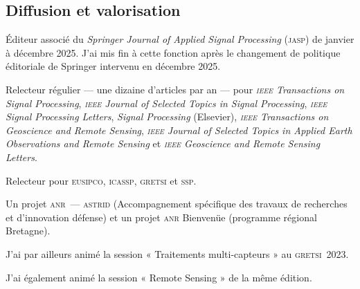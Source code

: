 


\subsection{Diffusion et valorisation}
\label{subsec:cv-diffusion}


\begin{cvfields}
  \item[Édition] Éditeur associé du \emph{Springer Journal of Applied Signal
    Processing} (\textsc{jasp}) de janvier à décembre 2025. J'ai mis fin à
    cette fonction après le changement de politique éditoriale de Springer
    intervenu en décembre 2025.
  \item[Revues] Relecteur régulier --- une dizaine d'articles par an --- pour
    \emph{\textsc{ieee} Transactions on Signal Processing},
    \emph{\textsc{ieee} Journal of Selected Topics in Signal Processing},
    \emph{\textsc{ieee} Signal Processing Letters}, \emph{Signal Processing}
    (Elsevier), \emph{\textsc{ieee} Transactions on Geoscience and Remote
    Sensing}, \emph{\textsc{ieee} Journal of Selected Topics in Applied Earth
    Observations and Remote Sensing} et \emph{\textsc{ieee} Geoscience and
    Remote Sensing Letters}.
  \item[Conférences] Relecteur pour \textsc{eusipco}, \textsc{icassp},
    \textsc{gretsi} et \textsc{ssp}.
  \item[Expertises] Un projet \textsc{anr}~--- \textsc{astrid}
    (Accompagnement spécifique des travaux de recherches et d'innovation
    défense) et un projet \textsc{anr} Bienvenüe (programme régional Bretagne).
\end{cvfields}



J'ai par ailleurs animé la session « Traitements multi-capteurs » au
\textsc{gretsi}~2023.

J'ai également animé la session « Remote Sensing » de la même édition.

